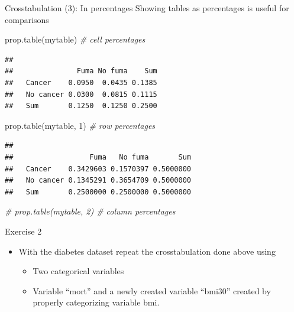 \documentclass[
  ignorenonframetext,
]{beamer}
\newenvironment{Shaded}{\begin{snugshade}}{\end{snugshade}}
\newcommand{\CommentTok}[1]{\textcolor[rgb]{0.56,0.35,0.01}{\textit{#1}}}
\newcommand{\DecValTok}[1]{\textcolor[rgb]{0.00,0.00,0.81}{#1}}
\newcommand{\FunctionTok}[1]{\textcolor[rgb]{0.00,0.00,0.00}{#1}}
\newcommand{\NormalTok}[1]{#1}
\providecommand{\tightlist}{%
  \setlength{\itemsep}{0pt}\setlength{\parskip}{0pt}}
\begin{document}
\begin{frame}[fragile]{Crosstabulation (3): In percentages}
\protect\hypertarget{crosstabulation-3-in-percentages}{}
Showing tables as percentages is useful for comparisons

\begin{Shaded}
\begin{Highlighting}[]
\FunctionTok{prop.table}\NormalTok{(mytable) }\CommentTok{\# cell percentages}
\end{Highlighting}
\end{Shaded}

\begin{verbatim}
##            
##               Fuma No fuma    Sum
##   Cancer    0.0950  0.0435 0.1385
##   No cancer 0.0300  0.0815 0.1115
##   Sum       0.1250  0.1250 0.2500
\end{verbatim}

\begin{Shaded}
\begin{Highlighting}[]
\FunctionTok{prop.table}\NormalTok{(mytable, }\DecValTok{1}\NormalTok{) }\CommentTok{\# row percentages}
\end{Highlighting}
\end{Shaded}

\begin{verbatim}
##            
##                  Fuma   No fuma       Sum
##   Cancer    0.3429603 0.1570397 0.5000000
##   No cancer 0.1345291 0.3654709 0.5000000
##   Sum       0.2500000 0.2500000 0.5000000
\end{verbatim}

\begin{Shaded}
\begin{Highlighting}[]
\CommentTok{\# prop.table(mytable, 2) \# column percentages}
\end{Highlighting}
\end{Shaded}
\end{frame}

\begin{frame}{Exercise 2}
\protect\hypertarget{exercise-2}{}
\begin{itemize}
\tightlist
\item
  With the diabetes dataset repeat the crosstabulation done above using

  \begin{itemize}
  \tightlist
  \item
    Two categorical variables
  \item
    Variable ``mort'' and a newly created variable ``bmi30'' created by
    properly categorizing variable bmi.
  \end{itemize}
\end{itemize}
\end{frame}
\end{document}
